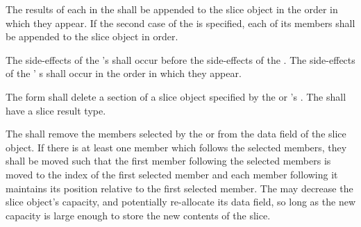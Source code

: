 \specsubsubitem
The results of each  in the 
shall be appended to the slice object in the order in which they appear. If the
second case of the  is specified, each of its members
shall be appended to the slice object in order.

\specsubsubitem
The side-effects of the 's  shall occur
before the side-effects of the . The
side-effects of the ' s shall
occur in the order in which they appear.

\specsubsubitem
The  form shall delete a section of a slice object specified by
the  or 's
. The  shall
have a slice result type.

\specsubsubitem
The  shall remove the members selected by the
 or  from the
data field of the slice object. If there is at least one member which follows
the selected members, they shall be moved such that the first member following
the selected members is moved to the index of the first selected member and each
member following it maintains its position relative to the first selected
member. The  may decrease the slice object's capacity, and
potentially re-allocate its data field, so long as the new capacity is large
enough to store the new contents of the slice.


\begin{grammar}
 \\
	 \terminal{(}  \terminal{)} \\
	 \terminal{(}  \terminal{,}  \terminal{)} \\
	  \terminal{(}  \terminal{)} \\
	  \terminal{(}  \terminal{,}  \terminal{)} \\
	 \terminal{(}  \terminal{)} \\
	  \terminal{(}  \terminal{)} \\
\end{grammar}

